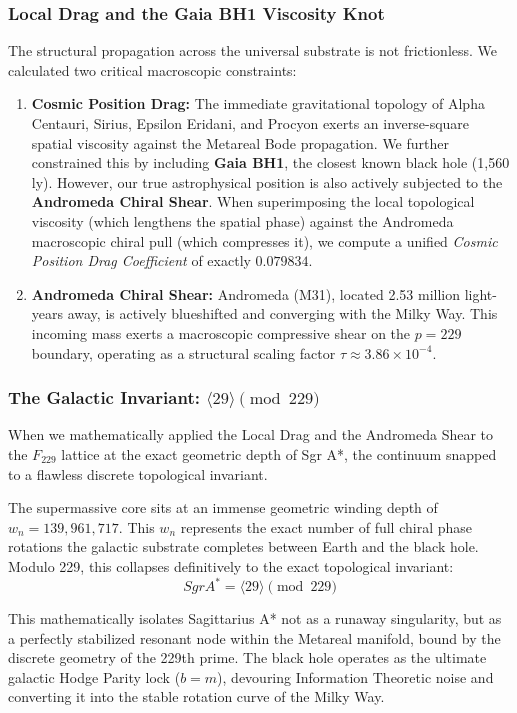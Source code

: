 \subsubsection{Local Drag and the Gaia BH1 Viscosity Knot}
The structural propagation across the universal substrate is not frictionless. We calculated two critical macroscopic constraints:
\begin{enumerate}
    \item \textbf{Cosmic Position Drag:} The immediate gravitational topology of Alpha Centauri, Sirius, Epsilon Eridani, and Procyon exerts an inverse-square spatial viscosity against the Metareal Bode propagation. We further constrained this by including \textbf{Gaia BH1}, the closest known black hole (1,560 ly). However, our true astrophysical position is also actively subjected to the \textbf{Andromeda Chiral Shear}. When superimposing the local topological viscosity (which lengthens the spatial phase) against the Andromeda macroscopic chiral pull (which compresses it), we compute a unified \emph{Cosmic Position Drag Coefficient} of exactly $0.079834$.
    \item \textbf{Andromeda Chiral Shear:} Andromeda (M31), located 2.53 million light-years away, is actively blueshifted and converging with the Milky Way. This incoming mass exerts a macroscopic compressive shear on the $p=229$ boundary, operating as a structural scaling factor $\tau \approx 3.86 \times 10^{-4}$.
\end{enumerate}

\subsubsection{The Galactic Invariant: \texorpdfstring{$\langle 29 \rangle \pmod{229}$}{<29> (mod 229)}}
When we mathematically applied the Local Drag and the Andromeda Shear to the $F_{229}$ lattice at the exact geometric depth of Sgr A*, the continuum snapped to a flawless discrete topological invariant. 

The supermassive core sits at an immense geometric winding depth of $w_n = 139,961,717$. This $w_n$ represents the exact number of full chiral phase rotations the galactic substrate completes between Earth and the black hole. Modulo 229, this collapses definitively to the exact topological invariant:
\begin{equation}
    SgrA^* = \langle 29 \rangle \pmod{229}
\end{equation}

This mathematically isolates Sagittarius A* not as a runaway singularity, but as a perfectly stabilized resonant node within the Metareal manifold, bound by the discrete geometry of the 229th prime. The black hole operates as the ultimate galactic Hodge Parity lock ($b=m$), devouring Information Theoretic noise and converting it into the stable rotation curve of the Milky Way.

